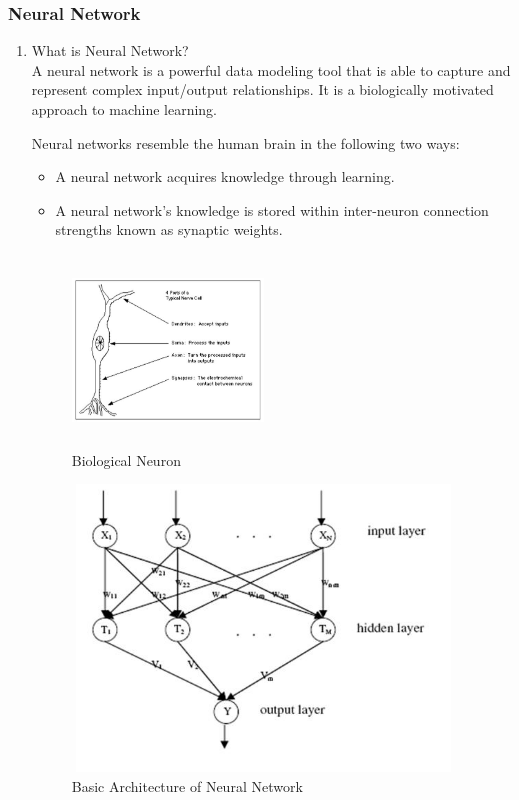 \documentclass[a4paper,14pt,onecolumn]{article}
\begin{document}
\subsubsection{Neural Network}
\begin{enumerate}
\item What is Neural Network?\\
              A neural network is a powerful data modeling tool that is able to capture and represent complex input/output relationships. It is a biologically motivated approach to machine learning.


Neural networks resemble the human brain in the following two ways: 
 \begin{itemize}	
\item A neural network acquires knowledge through learning. 
\item A neural network's knowledge is stored within inter-neuron connection strengths known as synaptic weights.
\end{itemize}

\begin{figure}[hbp]
\begin{center}
\includegraphics[height=2in,width=2in]
{Neuron.jpg}  
\caption{Biological Neuron}
\end{center}
\end{figure}  

\begin{figure}[hbp]
\begin{center}
\includegraphics[height=3in,width=4in]
{Neuralnetwork.jpg}  
\caption{Basic Architecture of Neural Network}
\end{center}
\end{figure} 


\end{enumerate}
\end{document}
